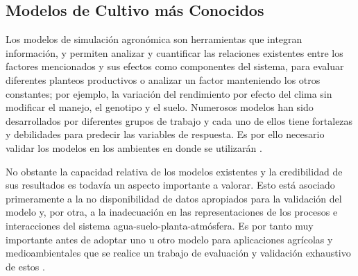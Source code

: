 \subsection{Modelos de Cultivo más Conocidos}

Los modelos de simulación agronómica son herramientas que integran información, y permiten analizar y cuantificar las relaciones existentes entre los factores mencionados y sus efectos como componentes del sistema, para evaluar diferentes planteos productivos o analizar un factor manteniendo los otros constantes; por ejemplo, la variación del rendimiento por efecto del clima sin modificar el manejo, el genotipo y el suelo. Numerosos modelos han sido desarrollados por diferentes grupos de trabajo y cada uno de ellos tiene fortalezas y debilidades para predecir las variables de respuesta. Es por ello necesario validar los modelos en los ambientes en donde se utilizarán \parencite{salvagiotti2003analisis}.

No obstante la capacidad relativa de los modelos existentes y la credibilidad de sus resultados es todavía un aspecto importante a valorar. Esto está asociado primeramente a la no disponibilidad de datos apropiados para la validación del modelo y, por otra, a la inadecuación en las representaciones de los procesos e interacciones del sistema agua-suelo-planta-atmósfera. Es por tanto muy importante antes de adoptar uno u otro modelo para aplicaciones agrícolas y medioambientales que se realice un trabajo de evaluación y validación exhaustivo de estos \parencite{lopez20143}.\\






















